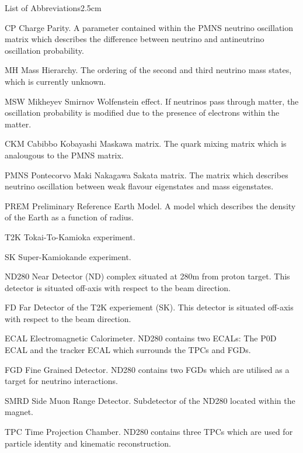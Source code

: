 \begin{mclistof}{List of Abbreviations}{2.5cm}

\item[CP]Charge Parity. A parameter contained within the PMNS neutrino oscillation matrix which describes the difference between neutrino and antineutrino oscillation probability.
\item[MH]Mass Hierarchy. The ordering of the second and third neutrino mass states, which is currently unknown.

\item[MSW]Mikheyev Smirnov Wolfenstein effect. If neutrinos pass through matter, the oscillation probability is modified due to the presence of electrons within the matter.
\item[CKM]Cabibbo Kobayashi Maskawa matrix. The quark mixing matrix which is analougous to the PMNS matrix.
\item[PMNS]Pontecorvo Maki Nakagawa Sakata matrix. The matrix which describes neutrino oscillation between weak flavour eigenstates and mass eigenstates.

\item[PREM]Preliminary Reference Earth Model. A model which describes the density of the Earth as a function of radius.

\item[T2K]Tokai-To-Kamioka experiment.
\item[SK]Super-Kamiokande experiment.

\item[ND280]Near Detector (ND) complex situated at 280m from proton target. This detector is situated \quickmath{2.5\deg} off-axis with respect to the beam direction.
\item[FD]Far Detector of the T2K experiement (SK). This detector is situated \quickmath{2.5\deg} off-axis with respect to the beam direction.

\item[ECAL]Electromagnetic Calorimeter. ND280 contains two ECALs: The P0D ECAL and the tracker ECAL which surrounds the TPCs and FGDs.
\item[FGD]Fine Grained Detector. ND280 contains two FGDs which are utilised as a target for neutrino interactions.
\item[SMRD]Side Muon Range Detector. Subdetector of the ND280 located within the magnet.
\item[TPC]Time Projection Chamber. ND280 contains three TPCs which are used for particle identity and kinematic reconstruction.


\end{mclistof}
